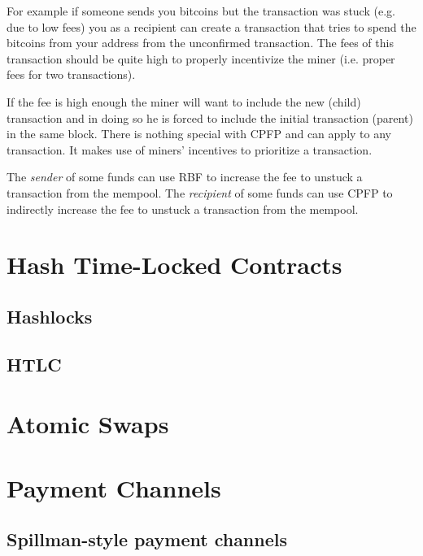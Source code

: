 For example if someone sends you bitcoins but the transaction was stuck (e.g. due to low fees) you as a recipient can create a transaction that tries to spend the bitcoins from your address from the unconfirmed transaction. The fees of this transaction should be quite high to properly incentivize the miner (i.e. proper fees for two transactions).

If the fee is high enough the miner will want to include the new (child) transaction and in doing so he is forced to include the initial transaction (parent) in the same block.
There is nothing special with CPFP and can apply to any transaction. It makes use of miners' incentives to prioritize a transaction.

\begin{note}
The \emph{sender} of some funds can use RBF to increase the fee to unstuck a transaction from the mempool. The \emph{recipient} of some funds can use CPFP to indirectly increase the fee to unstuck a transaction from the mempool.
\end{note}



\section{Hash Time-Locked Contracts}
\label{sec:htlc}

\subsection*{Hashlocks}


\subsection*{HTLC}


\section{Atomic Swaps}
\label{sec:atomic-swaps}


\section{Payment Channels}
\label{sec:payment-channels}


\subsection*{Spillman-style payment channels}



